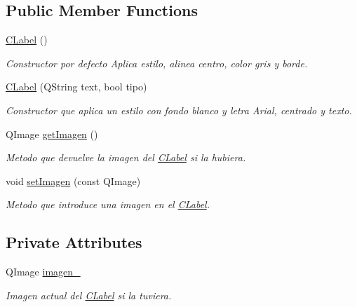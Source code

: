 \subsection*{Public Member Functions}
\begin{DoxyCompactItemize}
\item 
\hyperlink{classCLabel_abf086cf63a3e820257e656e7b608d312}{C\+Label} ()
\begin{DoxyCompactList}\small\item\em Constructor por defecto Aplica estilo, alinea centro, color gris y borde. \end{DoxyCompactList}\item 
\hyperlink{classCLabel_a2f7accc9637b63d705ba5418240eaf2d}{C\+Label} (Q\+String text, bool tipo)
\begin{DoxyCompactList}\small\item\em Constructor que aplica un estilo con fondo blanco y letra Arial, centrado y texto. \end{DoxyCompactList}\item 
Q\+Image \hyperlink{classCLabel_a79ebc8b728db45da16020cdeb2439625}{get\+Imagen} ()
\begin{DoxyCompactList}\small\item\em Metodo que devuelve la imagen del \hyperlink{classCLabel}{C\+Label} si la hubiera. \end{DoxyCompactList}\item 
void \hyperlink{classCLabel_ac44138a6205fa3b2bc8eee63263e6fc7}{set\+Imagen} (const Q\+Image)
\begin{DoxyCompactList}\small\item\em Metodo que introduce una imagen en el \hyperlink{classCLabel}{C\+Label}. \end{DoxyCompactList}\end{DoxyCompactItemize}
\subsection*{Private Attributes}
\begin{DoxyCompactItemize}
\item 
Q\+Image \hyperlink{classCLabel_abc23f3746354e8aac57516f34cb85fba}{imagen\+\_\+}
\begin{DoxyCompactList}\small\item\em Imagen actual del \hyperlink{classCLabel}{C\+Label} si la tuviera. \end{DoxyCompactList}\end{DoxyCompactItemize}


